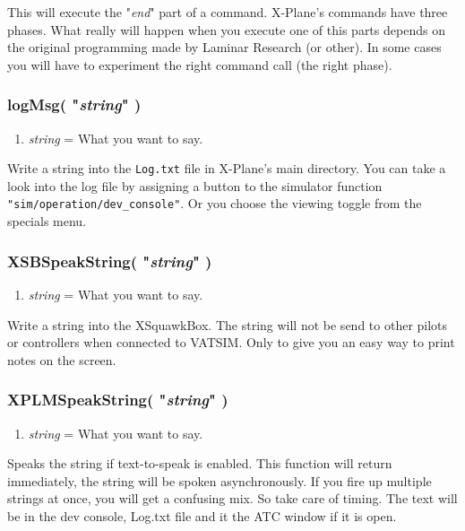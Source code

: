 \documentclass[11pt,parskip=half,a4paper]{scrartcl}
\begin{document}
This will execute the "\emph{end}" part of a command. X-Plane's commands have three phases. What really will happen when you execute one of this parts depends on the original programming made by Laminar Research  (or other). In some cases you will have to experiment the right command call (the right phase).

\subsubsection{logMsg( "\emph{string}" )}

\begin{enumerate}
	\item \emph{string} = What you want to say.
\end{enumerate}

Write a string into the \verb|Log.txt| file in X-Plane's main directory. You can take a look into the log file by assigning a button to the simulator function \verb|"sim/operation/dev_console"|. Or you choose the viewing toggle from the specials menu.

\subsubsection{XSBSpeakString( "\emph{string}" )}

\begin{enumerate}
	\item \emph{string} = What you want to say.
\end{enumerate}

Write a string into the XSquawkBox. The string will not be send to other pilots or controllers when connected to VATSIM. Only to give you an easy way to print notes on the screen.

\subsubsection{XPLMSpeakString( "\emph{string}" )}

\begin{enumerate}
	\item \emph{string} = What you want to say.
\end{enumerate}

Speaks the string if text-to-speak is enabled. This function will return immediately, the string will be spoken asynchronously. If you fire up multiple strings at once, you will get a confusing mix. So take care of timing. The text will be in the dev console, Log.txt file and it the ATC window if it is open.
\end{document}
